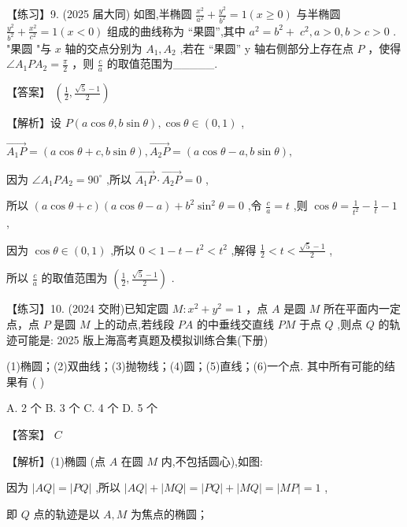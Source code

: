 \documentclass[10pt]{article}
\begin{document}
【练习】9. (2025 届大同) 如图,半椭圆 \(\frac{{x}^{2}}{{a}^{2}} + \frac{{y}^{2}}{{b}^{2}} = 1\left( {x \geq  0}\right)\) 与半椭圆 \(\frac{{y}^{2}}{{b}^{2}} + \frac{{x}^{2}}{{c}^{2}} = 1\left( {x < 0}\right)\) 组成的曲线称为 “果圆”,其中 \({a}^{2} = {b}^{2} + \; {c}^{2},a > 0,b > c > 0\) . "果圆 "与 \(x\) 轴的交点分别为 \({A}_{1},{A}_{2}\) ,若在 “果圆” y 轴右侧部分上存在点 \(P\) ，使得 \(\angle {A}_{1}P{A}_{2} = \frac{\pi }{2}\) ，则 \(\frac{c}{a}\) 的取值范围为\_\_\_\_\_.

【答案】 \(\left( {\frac{1}{2},\frac{\sqrt{5} - 1}{2}}\right)\)

【解析】设 \(P\left( {a\cos \theta ,b\sin \theta }\right) ,\cos \theta  \in  \left( {0,1}\right)\) ,

\(\overrightarrow{{A}_{1}P} = \left( {a\cos \theta  + c,b\sin \theta }\right) ,\overrightarrow{{A}_{2}P} = \left( {a\cos \theta  - a,b\sin \theta }\right) ,\)

因为 \(\angle {A}_{1}P{A}_{2} = {90}^{ \circ  }\) ,所以 \(\overrightarrow{{A}_{1}P} \cdot  \overrightarrow{{A}_{2}P} = 0\) ,

所以 \(\left( {a\cos \theta  + c}\right) \left( {a\cos \theta  - a}\right)  + {b}^{2}{\sin }^{2}\theta  = 0\) ,令 \(\frac{c}{a} = t\) ,则 \(\cos \theta  = \frac{1}{{t}^{2}} - \frac{1}{t} - 1\) ,

因为 \(\cos \theta  \in  \left( {0,1}\right)\) ,所以 \(0 < 1 - t - {t}^{2} < {t}^{2}\) ,解得 \(\frac{1}{2} < t < \frac{\sqrt{5} - 1}{2}\) ,

所以 \(\frac{c}{a}\) 的取值范围为 \(\left( {\frac{1}{2},\frac{\sqrt{5} - 1}{2}}\right)\) .

【练习】10. (2024 交附)已知定圆 \(M : {x}^{2} + {y}^{2} = 1\) ，点 \(A\) 是圆 \(M\) 所在平面内一定点，点 \(P\) 是圆 \(M\) 上的动点,若线段 \({PA}\) 的中垂线交直线 \({PM}\) 于点 \(Q\) ,则点 \(Q\) 的轨迹可能是: 2025 版上海高考真题及模拟训练合集(下册)

(1)椭圆；(2)双曲线；(3)抛物线；(4)圆；(5)直线；(6)一个点. 其中所有可能的结果有 ( )

A. 2 个 B. 3 个 C. 4 个 D. 5 个

【答案】 \(C\)

【解析】(1)椭圆 (点 \(A\) 在圆 \(M\) 内,不包括圆心),如图:

因为 \(\left| {AQ}\right|  = \left| {PQ}\right|\) ,所以 \(\left| {AQ}\right|  + \left| {MQ}\right|  = \left| {PQ}\right|  + \left| {MQ}\right|  = \left| {MP}\right|  = 1\) ,

即 \(Q\) 点的轨迹是以 \(A,M\) 为焦点的椭圆；
\end{document}
